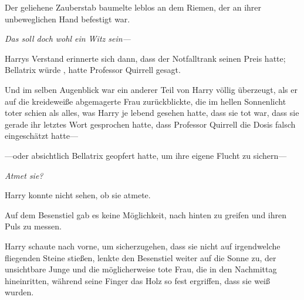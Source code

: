 Der geliehene Zauberstab baumelte leblos an dem Riemen, der an ihrer unbeweglichen Hand befestigt war.

\emph{Das soll doch wohl ein Witz sein—}

Harrys Verstand erinnerte sich dann, dass der Notfalltrank seinen Preis hatte; Bellatrix würde , hatte Professor Quirrell gesagt.

Und im selben Augenblick war ein anderer Teil von Harry völlig überzeugt, als er auf die kreideweiße abgemagerte Frau zurückblickte, die im hellen Sonnenlicht toter schien als alles, was Harry je lebend gesehen hatte, dass sie tot war, dass sie gerade ihr letztes Wort gesprochen hatte, dass Professor Quirrell die Dosis falsch eingeschätzt hatte—

—oder absichtlich Bellatrix geopfert hatte, um ihre eigene Flucht zu sichern—

\emph{Atmet sie?}

Harry konnte nicht sehen, ob sie atmete.

Auf dem Besenstiel gab es keine Möglichkeit, nach hinten zu greifen und ihren Puls zu messen.

Harry schaute nach vorne, um sicherzugehen, dass sie nicht auf irgendwelche fliegenden Steine stießen, lenkte den Besenstiel weiter auf die Sonne zu, der unsichtbare Junge und die möglicherweise tote Frau, die in den Nachmittag hineinritten, während seine Finger das Holz so fest ergriffen, dass sie weiß wurden.

